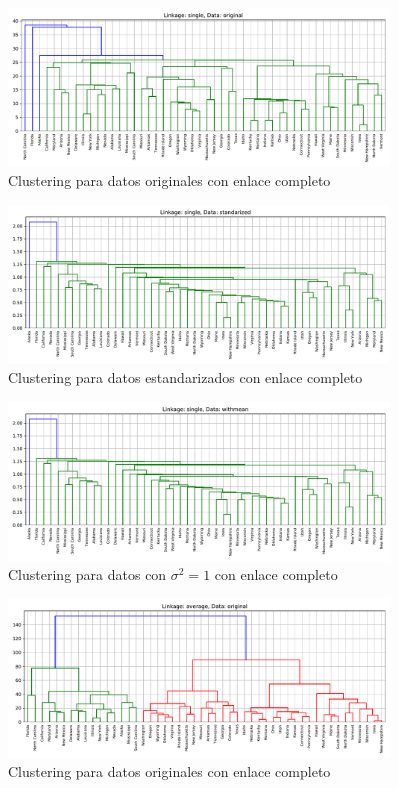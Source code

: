 \documentclass[11pt]{article}
\begin{document}
\begin{figure}[H]
    \centering
    \includegraphics[width = 0.90\textwidth]{2-singleoriginal.pdf}
    \caption{Clustering para datos originales con enlace completo}
    \label{2-singleoriginal}
\end{figure}
\begin{figure}[H]
    \centering
    \includegraphics[width = 0.90\textwidth]{2-singlestandarized.pdf}
    \caption{Clustering para datos estandarizados con enlace completo}
    \label{2-singlestandarized}
\end{figure}
\begin{figure}[H]
    \centering
    \includegraphics[width = 0.90\textwidth]{2-singlewithmean.pdf}
    \caption{Clustering para datos con $\sigma^2 = 1$ con enlace completo}
    \label{2-singlewithmean}
\end{figure}
\begin{figure}[H]
    \centering
    \includegraphics[width = 0.90\textwidth]{2-averageoriginal.pdf}
    \caption{Clustering para datos originales con enlace completo}
    \label{2-averageoriginal}
\end{figure}
\end{document}
